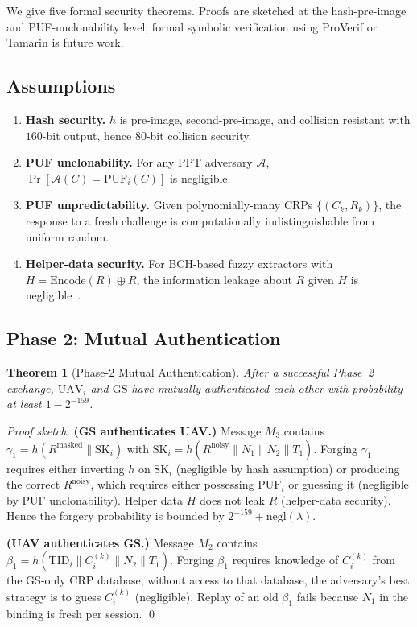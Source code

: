 \documentclass[journal,a4paper,10pt]{IEEEtran}
\newtheorem{theorem}{Theorem}
\begin{document}
We give five formal security theorems. Proofs are sketched at the
hash-pre-image and PUF-unclonability level; formal symbolic
verification using ProVerif or Tamarin is future work.

\subsection{Assumptions}
\begin{enumerate}[leftmargin=*]
\item \textbf{Hash security.} $h$ is pre-image, second-pre-image, and
  collision resistant with $160$-bit output, hence
  $80$-bit collision security.
\item \textbf{PUF unclonability.} For any PPT adversary
  $\mathcal{A}$,
  $\Pr[\mathcal{A}(C) = \mathrm{PUF}_i(C)]$ is negligible.
\item \textbf{PUF unpredictability.} Given polynomially-many
  CRPs $\{(C_k, R_k)\}$, the response to a fresh challenge
  is computationally indistinguishable from uniform random.
\item \textbf{Helper-data security.} For BCH-based fuzzy extractors
  with $H = \mathrm{Encode}(R) \oplus R$, the information leakage
  about $R$ given $H$ is negligible~\cite{helper_data_masking}.
\end{enumerate}

\subsection{Phase 2: Mutual Authentication}
\begin{theorem}[Phase-2 Mutual Authentication]
\label{thm:p2_mutual}
After a successful Phase~2 exchange, $\mathrm{UAV}_i$ and
$\mathrm{GS}$ have mutually authenticated each other with
probability at least $1 - 2^{-159}$.
\end{theorem}
\begin{proof}[Proof sketch]
\textbf{(GS authenticates UAV.)} Message $M_3$ contains
$\gamma_1 = h(R^{\mathrm{masked}} \| \mathrm{SK}_i)$ with
$\mathrm{SK}_i = h(R^{\mathrm{noisy}} \| N_1 \| N_2 \| T_1)$.
Forging $\gamma_1$ requires either inverting $h$ on
$\mathrm{SK}_i$ (negligible by hash assumption) or producing the
correct $R^{\mathrm{noisy}}$, which requires either possessing
$\mathrm{PUF}_i$ or guessing it (negligible by PUF
unclonability). Helper data $H$ does not leak $R$
(helper-data security). Hence the forgery probability is
bounded by $2^{-159} + \mathrm{negl}(\lambda)$.

\textbf{(UAV authenticates GS.)} Message $M_2$ contains
$\beta_1 = h(\mathrm{TID}_i \| C_i^{(k)} \| N_2 \| T_1)$. Forging
$\beta_1$ requires knowledge of $C_i^{(k)}$ from the GS-only CRP
database; without access to that database, the adversary's best
strategy is to guess $C_i^{(k)}$ (negligible). Replay of an old
$\beta_1$ fails because $N_1$ in the binding is fresh per session.
\qed
\end{proof}
\end{document}
